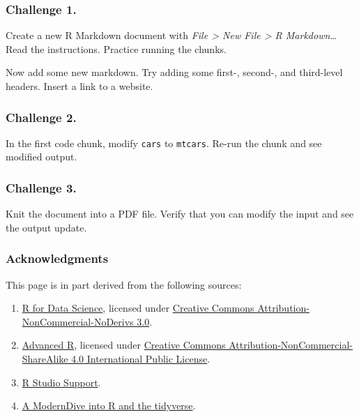 \documentclass[]{book}
\begin{document}
\subsubsection*{Challenge 1.}\label{challenge-1.}

Create a new R Markdown document with \emph{File \textgreater{} New File
\textgreater{} R Markdown\ldots{}} Read the instructions. Practice
running the chunks.

Now add some new markdown. Try adding some first-, second-, and
third-level headers. Insert a link to a website.

\subsubsection*{Challenge 2.}\label{challenge-2.}

In the first code chunk, modify \texttt{cars} to \texttt{mtcars}. Re-run
the chunk and see modified output.

\subsubsection*{Challenge 3.}\label{challenge-3.}

Knit the document into a PDF file. Verify that you can modify the input
and see the output update.

\subsubsection*{Acknowledgments}\label{acknowledgments-1}

This page is in part derived from the following sources:

\begin{enumerate}
\def\labelenumi{\arabic{enumi}.}
\item
  \href{https://r4ds.had.co.nz}{R for Data Science}, licensed under
  \href{https://creativecommons.org/licenses/by-nc-nd/3.0/us/}{Creative
  Commons Attribution-NonCommercial-NoDerivs 3.0}.
\item
  \href{https://adv-r.hadley.nz/}{Advanced R}, licensed under
  \href{https://creativecommons.org/licenses/by-nc-sa/4.0/}{Creative
  Commons Attribution-NonCommercial-ShareAlike 4.0 International Public
  License}.
\item
  \href{https://support.rstudio.com/hc/en-us/articles/200484448}{R
  Studio Support}.
\item
  \href{https://moderndive.netlify.com/1-getting-started.html}{A
  ModernDive into R and the tidyverse}.
\end{enumerate}
\end{document}
